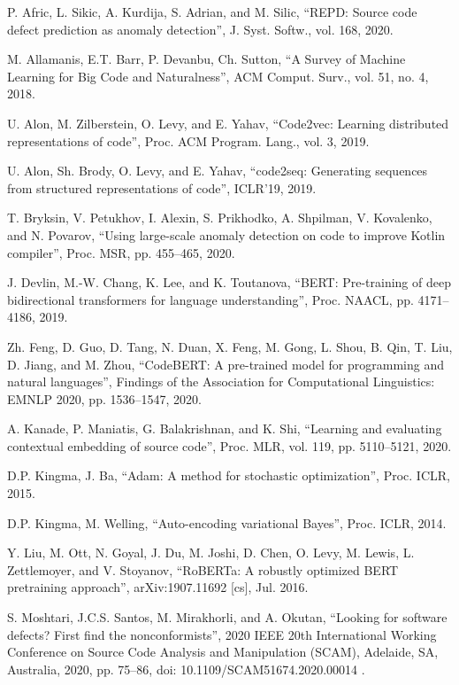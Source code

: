 \documentclass[conference]{ieeetran}
\begin{document}
\begin{thebibliography}{00}
 P. Afric, L. Sikic, A. Kurdija, S. Adrian, and M. Silic,
 ``REPD: Source code defect prediction as anomaly detection'',
 J. Syst. Softw., vol. 168, 2020.

 M. Allamanis, E.T. Barr, P. Devanbu, Ch. Sutton,
 ``A Survey of Machine Learning for Big Code and Naturalness'',
 ACM Comput. Surv., vol. 51, no. 4, 2018.

 U. Alon, M. Zilberstein, O. Levy, and E. Yahav,
 ``Code2vec: Learning distributed representations of code'',
 Proc. ACM Program. Lang., vol. 3, 2019.

 U. Alon, Sh. Brody, O. Levy, and E. Yahav,
 ``code2seq: Generating sequences from structured representations of code'',
 ICLR'19, 2019.

 T. Bryksin, V. Petukhov, I. Alexin, S. Prikhodko, A. Shpilman, V. Kovalenko, and  N. Povarov,
 ``Using large-scale anomaly detection on code to improve Kotlin compiler'',
 Proc. MSR, pp. 455--465, 2020.

 J. Devlin, M.-W. Chang, K. Lee, and K. Toutanova,
 ``BERT: Pre-training of deep bidirectional transformers for language understanding'',
 Proc. NAACL, pp. 4171--4186, 2019.

 Zh. Feng, D. Guo, D. Tang, N. Duan, X. Feng, M. Gong, L. Shou, B. Qin, T. Liu, D. Jiang, and M. Zhou,
``CodeBERT: A pre-trained model for programming and natural languages'',
 Findings of the Association for Computational Linguistics: EMNLP 2020, pp. 1536--1547, 2020.

 A. Kanade, P. Maniatis, G. Balakrishnan, and K. Shi,
 ``Learning and evaluating contextual embedding of source code'',
 Proc. MLR, vol. 119, pp. 5110--5121, 2020.

 D.P. Kingma, J. Ba,
 ``Adam: A method for stochastic optimization'',
 Proc. ICLR, 2015.

 D.P. Kingma, M. Welling,
 ``Auto-encoding variational Bayes'',
 Proc. ICLR, 2014.

 Y. Liu, M. Ott, N. Goyal, J. Du, M. Joshi, D. Chen, O. Levy, M. Lewis, L. Zettlemoyer, and V. Stoyanov,
 ``RoBERTa: A robustly optimized BERT pretraining approach'',
 arXiv:1907.11692 [cs], Jul. 2016.

 S. Moshtari, J.C.S. Santos, M. Mirakhorli, and A. Okutan,
 ``Looking for software defects? First find the nonconformists'',
 2020 IEEE 20th International Working Conference on Source Code Analysis and Manipulation (SCAM), Adelaide, SA, Australia, 2020, pp. 75--86, doi: 10.1109/SCAM51674.2020.00014 .


\end{thebibliography}
\end{document}
